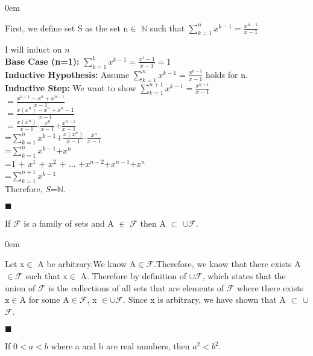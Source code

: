 \documentclass[12pt]{article}
\renewcommand{\qed}{\hfill$\blacksquare$}
\renewenvironment{proof}{\begin{addmargin}[1em]{0em}\begin{newproof}}{\end{newproof}\end{addmargin}\qed}
\newenvironment{theorem}[2][Theorem]{\begin{trivlist}
\item[\hskip \labelsep {\bfseries #1}\hskip \labelsep {\bfseries #2.}]}{\end{trivlist}}
\begin{document}
\begin{proof}[Proof]
First, we define set S as the set {n$\in$ $\mathbb{N}$} such that $\sum_{k=1}^{n}x^{k-1}= \frac{x^{n-1}}{x-1}$

I will induct on $n$ \\
\textbf{Base Case (n=1): } $\sum_{k=1}^{1}x^{k-1} = \frac{x^{1}-1}{x-1}=1$\\

\textbf{Inductive Hypothesis: } Assume $\sum_{k=1}^{n}x^{k-1}= \frac{x^{n-1}}{x-1}$ holds for n. \\

\textbf{Inductive Step: } We want to show $\sum_{k=1}^{n+1}x^{k-1}= \frac{x^{n+1}}{x-1}$ \\
$=\frac{x^{n+1}-x^{n}+x^{n-1}}{x-1}$\\
$=\frac{x(x^{n})-x^{n}+x^{n}-1}{x-1}$\\
$=\frac{x(x^{n})}{x-1}$-$\frac{x^{n}}{x-1}$+$\frac{x^{n-1}}{x-1}$\\
=$\sum_{k=1}^{n}x^{k-1}$+$\frac{x(x^{n})}{x-1}$-$\frac{x^{n}}{x-1}$\\
=$\sum_{k=1}^{n}x^{k-1}$+$x^{n}$\\
=$1$ + $x^{1}$ + $x^{2}$ + ... +$x^{n-2}$+$x^{n-1}$+$x^{n}$\\
=$\sum_{k=1}^{n+1}x^{k-1}$\\
Therefore, $S$=$\mathbb{N}$.

\end{proof}

\begin{theorem}{3.2}
If $\mathcal{F}$ is a family of sets and A $\in$ $\mathcal{F}$ then A $\subset$ $\cup$$\mathcal{F}$.

\end{theorem}

\begin{proof}[Proof]
Let x$\in$ A be arbitrary.We know A$\in$$\mathcal{F}$.Therefore, we know that there exists A $\in$$\mathcal{F}$ such that x$\in$ A. Therefore by definition of $\cup$$\mathcal{F}$, which states that the union of $\mathcal{F}$ is the collections of all sets that are elements of $\mathcal{F}$ where there exists x$\in$A for some A$\in$$\mathcal{F}$, x $\in$$\cup$$\mathcal{F}$. Since x is arbitrary, we have shown that A $\subset$ $\cup$$\mathcal{F}$.

\end{proof}

\begin{theorem}{6.1}
If $0< a < b$ where a and b are real numbers, then $a^{2} < b^{2}$.


\end{theorem}
\end{document}
